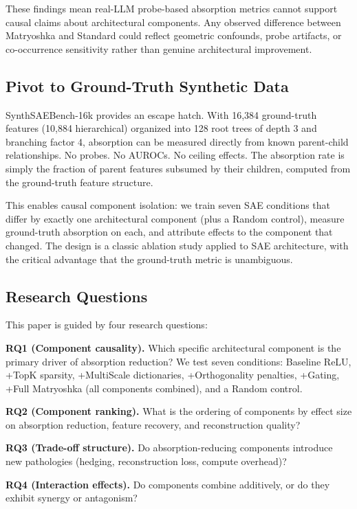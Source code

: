 \documentclass{article}
\begin{document}
These findings mean real-LLM probe-based absorption metrics cannot support causal claims about architectural components. Any observed difference between Matryoshka and Standard could reflect geometric confounds, probe artifacts, or co-occurrence sensitivity rather than genuine architectural improvement.

\subsection{Pivot to Ground-Truth Synthetic Data}

SynthSAEBench-16k \citep{chanin2026synthsaebench} provides an escape hatch. With 16,384 ground-truth features (10,884 hierarchical) organized into 128 root trees of depth 3 and branching factor 4, absorption can be measured directly from known parent-child relationships. No probes. No AUROCs. No ceiling effects. The absorption rate is simply the fraction of parent features subsumed by their children, computed from the ground-truth feature structure.

This enables causal component isolation: we train seven SAE conditions that differ by exactly one architectural component (plus a Random control), measure ground-truth absorption on each, and attribute effects to the component that changed. The design is a classic ablation study applied to SAE architecture, with the critical advantage that the ground-truth metric is unambiguous.

\subsection{Research Questions}

This paper is guided by four research questions:

\textbf{RQ1 (Component causality).} Which specific architectural component is the primary driver of absorption reduction? We test seven conditions: Baseline ReLU, +TopK sparsity, +MultiScale dictionaries, +Orthogonality penalties, +Gating, +Full Matryoshka (all components combined), and a Random control.

\textbf{RQ2 (Component ranking).} What is the ordering of components by effect size on absorption reduction, feature recovery, and reconstruction quality?

\textbf{RQ3 (Trade-off structure).} Do absorption-reducing components introduce new pathologies (hedging, reconstruction loss, compute overhead)?

\textbf{RQ4 (Interaction effects).} Do components combine additively, or do they exhibit synergy or antagonism?
\end{document}
